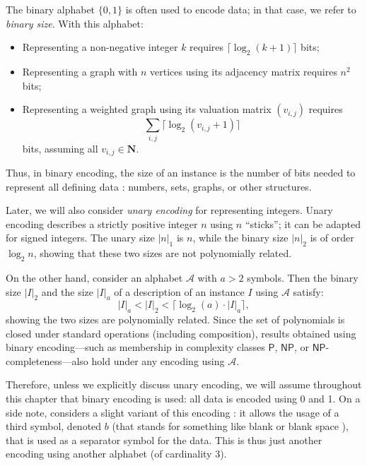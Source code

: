 The binary alphabet \( \{0, 1\} \) is often used to encode data; in that case, we refer to \emph{binary size}. With this alphabet:
\begin{itemize}
    \item Representing a non-negative integer \( k \) requires \( \lceil \log_2(k+1) \rceil \) bits;
    \item Representing a graph with \( n \) vertices using its adjacency matrix requires \( n^2 \) bits;
    \item Representing a weighted graph using its valuation matrix \( (v_{i,j}) \) requires
    \[
        \sum_{i,j} \lceil \log_2(v_{i,j} + 1) \rceil
    \]
    bits, assuming all \( v_{i,j} \in \mathbf N \).
\end{itemize}

Thus, in binary encoding, the size of an instance is the number of bits needed to represent all defining data : numbers, sets, graphs, or other structures.

Later, we will also consider \emph{unary encoding} for representing integers. Unary encoding describes a strictly positive integer \( n \) using \( n \) ``sticks''; it can be adapted for signed integers. The unary size \( |n|_1 \) is \( n \), while the binary size \( |n|_2 \) is of order \( \log_2 n \), showing that these two sizes are not polynomially related.

On the other hand, consider an alphabet \( \mathcal A \) with \( a > 2 \) symbols. Then the binary size \( |I|_2 \) and the size \( |I|_a \) of a description of an instance \( I \) using \( \mathcal A \) satisfy:
\[
|I|_a < |I|_2 < \lceil \log_2(a) \cdot |I|_a \rceil,
\]
showing the two sizes are polynomially related. Since the set of polynomials is closed under standard operations (including composition), results obtained using binary encoding—such as membership in complexity classes \( \mathsf{P} \), \( \mathsf{NP} \), or \( \mathsf{NP} \)-completeness—also hold under any encoding using \( \mathcal A \).

Therefore, unless we explicitly discuss unary encoding, we will assume throughout this chapter that binary encoding is used: all data is encoded using 0 and 1. On a side note, \cite{charonhudry2019} considers a slight variant of this encoding : it allows the usage of a third symbol, denoted $ b $ (that stands for something like \og blank \fg or \og blank space \fg), that is used as a separator symbol for the data. This is thus just another encoding using another alphabet (of cardinality 3).

